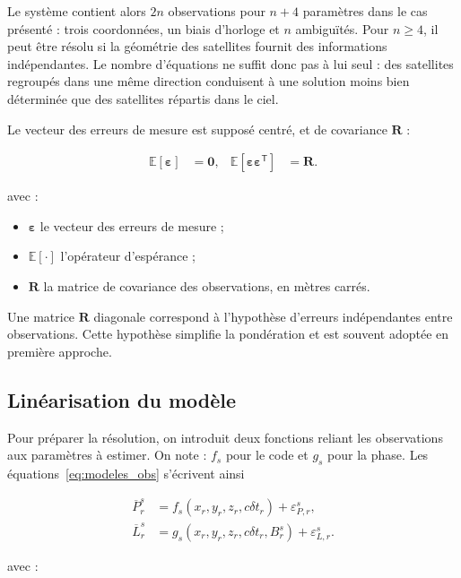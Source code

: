 Le système contient alors $2n$ observations pour $n+4$ paramètres dans le cas
présenté : trois coordonnées, un biais d'horloge et $n$ ambiguïtés. Pour
$n\geq4$, il peut être résolu si la géométrie des satellites fournit des
informations indépendantes. Le nombre d'équations ne suffit donc pas à lui
seul : des satellites regroupés dans une même direction conduisent à une
solution moins bien déterminée que des satellites répartis dans le ciel.

Le vecteur des erreurs de mesure est supposé centré, et de covariance $\mathbf R$ :

\begin{align}
\mathbb E[\boldsymbol\varepsilon]
&=\mathbf0,
&
\mathbb E[\boldsymbol\varepsilon\boldsymbol\varepsilon^{\mathsf T}]
&=\mathbf R.
\label{eq:measurement_noise_statistics}
\end{align}

avec :

\begin{itemize}
    \item $\boldsymbol\varepsilon$ le vecteur des erreurs de mesure ;
    \item $\mathbb E[\cdot]$ l'opérateur d'espérance ;
    \item $\mathbf R$ la matrice de covariance des observations, en mètres
    carrés.
\end{itemize}

Une matrice $\mathbf R$ diagonale correspond à l'hypothèse d'erreurs
indépendantes entre observations. Cette hypothèse simplifie la pondération et
est souvent adoptée en première approche. 

\subsection{Linéarisation du modèle}

Pour préparer la résolution, on introduit deux fonctions reliant les observations aux paramètres à estimer. On note :
$f_s$ pour le code et $g_s$ pour la phase. Les
équations~\eqref{eq:modeles_obs} s'écrivent ainsi

\begin{align}
\overline P_r^s
&=f_s(x_r,y_r,z_r,c\delta t_r)+\varepsilon_{P,r}^s,
\\
\overline L_r^s
&=g_s(x_r,y_r,z_r,c\delta t_r,B_r^s)+\varepsilon_{L,r}^s.
\label{eq:explicit_observation_functions}
\end{align}

avec :

